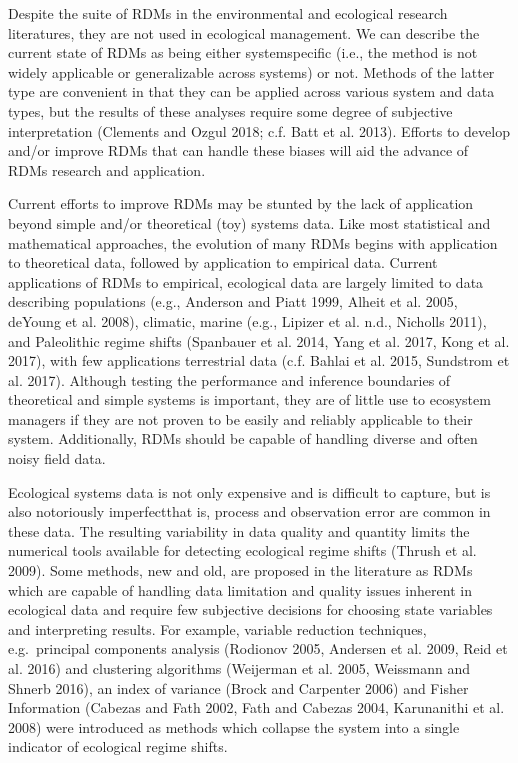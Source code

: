 \documentclass[12pt,twoside,openany]{reedthesis}
\begin{document}
Despite the suite of RDMs in the environmental and ecological research
literatures, they are not used in ecological management. We can describe
the current state of RDMs as being either systemspecific (i.e., the
method is not widely applicable or generalizable across systems) or not.
Methods of the latter type are convenient in that they can be applied
across various system and data types, but the results of these analyses
require some degree of subjective interpretation (Clements and Ozgul
2018; c.f. Batt et al. 2013). Efforts to develop and/or improve RDMs
that can handle these biases will aid the advance of RDMs research and
application.

Current efforts to improve RDMs may be stunted by the lack of
application beyond simple and/or theoretical (toy) systems data. Like
most statistical and mathematical approaches, the evolution of many RDMs
begins with application to theoretical data, followed by application to
empirical data. Current applications of RDMs to empirical, ecological
data are largely limited to data describing populations (e.g., Anderson
and Piatt 1999, Alheit et al. 2005, deYoung et al. 2008), climatic,
marine (e.g., Lipizer et al. n.d., Nicholls 2011), and Paleolithic
regime shifts (Spanbauer et al. 2014, Yang et al. 2017, Kong et al.
2017), with few applications terrestrial data (c.f. Bahlai et al. 2015,
Sundstrom et al. 2017). Although testing the performance and inference
boundaries of theoretical and simple systems is important, they are of
little use to ecosystem managers if they are not proven to be easily and
reliably applicable to their system. Additionally, RDMs should be
capable of handling diverse and often noisy field data.

Ecological systems data is not only expensive and is difficult to
capture, but is also notoriously imperfectthat is, process and
observation error are common in these data. The resulting variability in
data quality and quantity limits the numerical tools available for
detecting ecological regime shifts (Thrush et al. 2009). Some methods,
new and old, are proposed in the literature as RDMs which are capable of
handling data limitation and quality issues inherent in ecological data
and require few subjective decisions for choosing state variables and
interpreting results. For example, variable reduction techniques,
e.g.~principal components analysis (Rodionov 2005, Andersen et al. 2009,
Reid et al. 2016) and clustering algorithms (Weijerman et al. 2005,
Weissmann and Shnerb 2016), an index of variance (Brock and Carpenter
2006) and Fisher Information (Cabezas and Fath 2002, Fath and Cabezas
2004, Karunanithi et al. 2008) were introduced as methods which collapse
the system into a single indicator of ecological regime shifts.
\end{document}
